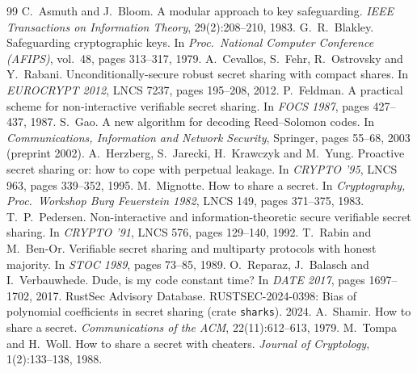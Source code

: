 \documentclass[11pt,a4paper]{article}
\theoremstyle{plain}
\theoremstyle{definition}
\begin{document}
\begin{thebibliography}{99}\small
{} C.~Asmuth and J.~Bloom. A modular approach to key safeguarding.
\emph{IEEE Transactions on Information Theory}, 29(2):208--210, 1983.
 G.~R.~Blakley. Safeguarding cryptographic keys. In \emph{Proc.\ National
Computer Conference (AFIPS)}, vol.~48, pages 313--317, 1979.
 A.~Cevallos, S.~Fehr, R.~Ostrovsky and Y.~Rabani. Unconditionally-secure robust
secret sharing with compact shares. In \emph{EUROCRYPT 2012}, LNCS 7237, pages 195--208, 2012.
 P.~Feldman. A practical scheme for non-interactive verifiable secret sharing.
In \emph{FOCS 1987}, pages 427--437, 1987.
 S.~Gao. A new algorithm for decoding Reed--Solomon codes. In \emph{Communications,
Information and Network Security}, Springer, pages 55--68, 2003 (preprint 2002).
 A.~Herzberg, S.~Jarecki, H.~Krawczyk and M.~Yung. Proactive secret sharing
or: how to cope with perpetual leakage. In \emph{CRYPTO '95}, LNCS 963, pages 339--352, 1995.
 M.~Mignotte. How to share a secret. In \emph{Cryptography, Proc.\ Workshop
Burg Feuerstein 1982}, LNCS 149, pages 371--375, 1983.
 T.~P.~Pedersen. Non-interactive and information-theoretic secure verifiable
secret sharing. In \emph{CRYPTO '91}, LNCS 576, pages 129--140, 1992.
 T.~Rabin and M.~Ben-Or. Verifiable secret sharing and multiparty protocols
with honest majority. In \emph{STOC 1989}, pages 73--85, 1989.
 O.~Reparaz, J.~Balasch and I.~Verbauwhede. Dude, is my code constant time? In
\emph{DATE 2017}, pages 1697--1702, 2017.
 RustSec Advisory Database. RUSTSEC-2024-0398: Bias of polynomial coefficients in
secret sharing (crate \texttt{sharks}). 2024.
 A.~Shamir. How to share a secret. \emph{Communications of the ACM},
22(11):612--613, 1979.
 M.~Tompa and H.~Woll. How to share a secret with cheaters. \emph{Journal of
Cryptology}, 1(2):133--138, 1988.
\end{thebibliography}
\end{document}
